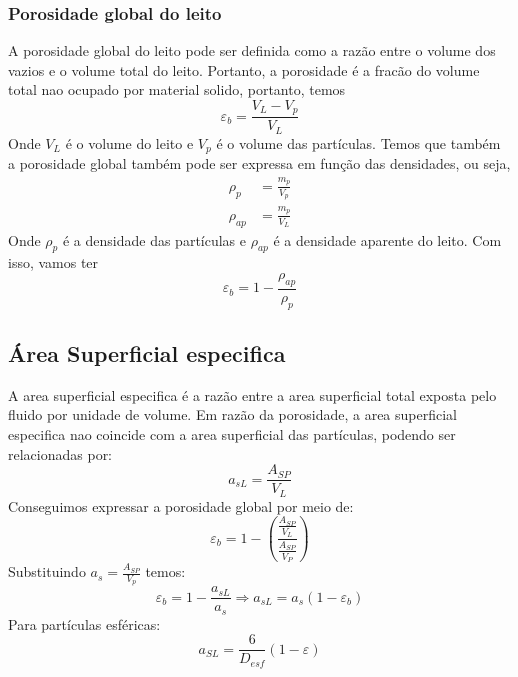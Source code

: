 \subsubsection{Porosidade global do leito}
A porosidade global do leito pode ser definida como a razão entre o volume dos vazios e o volume
total do leito. Portanto, a porosidade é a fracão do volume total nao ocupado por material solido,
portanto, temos
\begin{equation}
    \varepsilon _{b} = \frac{V_{L} - V_{p} }{V_{L}} 
\end{equation}
Onde \(V_{L}\) é o volume do leito e \(V_{p}\) é o volume das partículas. Temos que também a
porosidade global também pode ser expressa em função das densidades, ou seja,
\begin{align}
    \rho _{p} &= \frac{m_{p} }{V_{p} }\\
    \rho _{ap} &= \frac{m_{p} }{V_{L} }
\end{align}
Onde \(\rho _{p} \) é a densidade das partículas e \(\rho _{ap} \) é a densidade aparente do leito.
Com isso, vamos ter
\begin{equation}
    \varepsilon _{b} = 1 - \frac{\rho _{ap}}{\rho _{p}}
\end{equation}
\subsection{Área Superficial especifica}
A area superficial especifica é a razão entre a area superficial total exposta pelo fluido por
unidade de volume. Em razão da porosidade, a area superficial especifica nao coincide com a area
superficial das partículas, podendo ser relacionadas por:
\begin{equation}
    a_{sL} = \frac{A_{SP} }{V_{L} } 
\end{equation}
Conseguimos expressar a porosidade global por meio de:
\begin{equation}
    \varepsilon _{b} = 1 - \left( \frac{\frac{A_{SP} }{V_{L} }}{\frac{A_{SP} }{V_{P} }} \right) 
\end{equation}
Substituindo \(a_{s} = \frac{A_{SP} }{V_{p} }\) temos:
\begin{equation}
    \varepsilon _{b} = 1 - \frac{a_{sL} }{a_{s} } \Rightarrow a_{sL} = a_{s} \left( 1 - \varepsilon _{b} \right)
\end{equation} 
Para partículas esféricas:
\begin{equation}
    a_{SL} = \frac{6}{D_{esf} }\left( 1 - \varepsilon  \right) 
\end{equation}
